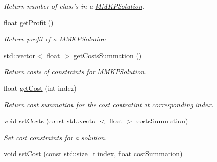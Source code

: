 \begin{DoxyCompactItemize}
\begin{DoxyCompactList}\small\item\em Return number of class's in a \hyperlink{class_m_m_k_p_solution}{M\+M\+K\+P\+Solution}. \end{DoxyCompactList}\item 
float \hyperlink{class_m_m_k_p_solution_a30861a1be3da4c14ae262778b5c26946}{get\+Profit} ()
\begin{DoxyCompactList}\small\item\em Return profit of a \hyperlink{class_m_m_k_p_solution}{M\+M\+K\+P\+Solution}. \end{DoxyCompactList}\item 
std\+::vector$<$ float $>$ \hyperlink{class_m_m_k_p_solution_a74f36885ab0d8911685463a11e4b23e6}{get\+Costs\+Summation} ()
\begin{DoxyCompactList}\small\item\em Return costs of constraints for \hyperlink{class_m_m_k_p_solution}{M\+M\+K\+P\+Solution}. \end{DoxyCompactList}\item 
\hypertarget{class_m_m_k_p_solution_a99e893752b315e5498f133b42386e2ce}{float \hyperlink{class_m_m_k_p_solution_a99e893752b315e5498f133b42386e2ce}{get\+Cost} (int index)}\label{class_m_m_k_p_solution_a99e893752b315e5498f133b42386e2ce}

\begin{DoxyCompactList}\small\item\em Return cost summation for the cost contratint at corresponding index. \end{DoxyCompactList}\item 
\hypertarget{class_m_m_k_p_solution_a515ae19d6c4f860ca1d1a817df856d38}{void \hyperlink{class_m_m_k_p_solution_a515ae19d6c4f860ca1d1a817df856d38}{set\+Costs} (const std\+::vector$<$ float $>$ costs\+Summation)}\label{class_m_m_k_p_solution_a515ae19d6c4f860ca1d1a817df856d38}

\begin{DoxyCompactList}\small\item\em Set cost constraints for a solution. \end{DoxyCompactList}\item 
\hypertarget{class_m_m_k_p_solution_a873043ef3d838c1c01ce9d72100e7d0b}{void \hyperlink{class_m_m_k_p_solution_a873043ef3d838c1c01ce9d72100e7d0b}{set\+Cost} (const std\+::size\+\_\+t index, float cost\+Summation)}\label{class_m_m_k_p_solution_a873043ef3d838c1c01ce9d72100e7d0b}


\end{DoxyCompactItemize}
